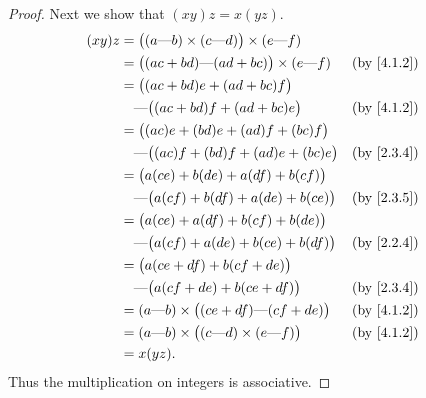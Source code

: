 \begin{proof}
  Next we show that \((xy)z = x(yz)\).
  \begin{align*}
    (xy)z & = \big((a \text{---} b) \times (c \text{---} d)\big) \times (e \text{---} f)                 \\
          & = \big((ac + bd) \text{---} (ad + bc)\big) \times (e \text{---} f)           &  & \by{4.1.2} \\
          & = \big((ac + bd)e + (ad + bc)f\big)                                                          \\
          & \quad \text{---} \big((ac + bd)f + (ad + bc)e\big)                           &  & \by{4.1.2} \\
          & = \big((ac)e + (bd)e + (ad)f + (bc)f\big)                                                    \\
          & \quad \text{---} \big((ac)f + (bd)f + (ad)e + (bc)e\big)                     &  & \by{2.3.4} \\
          & = \big(a(ce) + b(de) + a(df) + b(cf)\big)                                                    \\
          & \quad \text{---} \big(a(cf) + b(df) + a(de) + b(ce)\big)                     &  & \by{2.3.5} \\
          & = \big(a(ce) + a(df) + b(cf) + b(de)\big)                                                    \\
          & \quad \text{---} \big(a(cf) + a(de) + b(ce) + b(df)\big)                     &  & \by{2.2.4} \\
          & = \big(a(ce + df) + b(cf + de)\big)                                                          \\
          & \quad \text{---} \big(a(cf + de) + b(ce + df)\big)                           &  & \by{2.3.4} \\
          & = (a \text{---} b) \times \big((ce + df) \text{---} (cf + de)\big)           &  & \by{4.1.2} \\
          & = (a \text{---} b) \times \big((c \text{---} d) \times (e \text{---} f)\big) &  & \by{4.1.2} \\
          & = x(yz).
  \end{align*}
  Thus the multiplication on integers is associative.


\end{proof}
